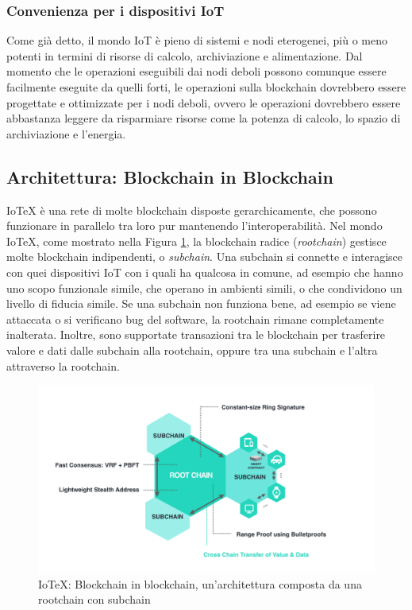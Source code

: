 \subsubsection{Convenienza per i dispositivi IoT}
Come già detto, il mondo IoT è pieno di sistemi e nodi eterogenei, più o meno potenti in termini di risorse di calcolo, archiviazione e alimentazione. Dal momento che le operazioni eseguibili dai nodi deboli possono comunque essere facilmente eseguite da quelli forti, le operazioni sulla blockchain dovrebbero essere progettate e ottimizzate per i nodi deboli, ovvero le operazioni dovrebbero essere abbastanza leggere da risparmiare risorse come la potenza di calcolo, lo spazio di archiviazione e l'energia.

\subsection{Architettura: Blockchain in Blockchain}
IoTeX è una rete di molte blockchain disposte gerarchicamente, che possono funzionare in parallelo tra loro pur mantenendo l'interoperabilità. Nel mondo IoTeX, come mostrato nella Figura \ref{fig:fig1}, la blockchain radice (\emph{rootchain}) gestisce molte blockchain indipendenti, o \emph{subchain}. Una subchain si connette e interagisce con quei dispositivi IoT con i quali ha qualcosa in comune, ad esempio che hanno uno scopo funzionale simile, che operano in ambienti simili, o che condividono un livello di fiducia simile. Se una subchain non funziona bene, ad esempio se viene attaccata o si verificano bug del software, la rootchain rimane completamente inalterata. Inoltre, sono supportate transazioni tra le blockchain per trasferire valore e dati dalle subchain alla rootchain, oppure tra una subchain e l'altra attraverso la rootchain.

\begin{figure}[ht]
	\includegraphics[width=\textwidth]{Figura1.png}
	\caption{IoTeX: Blockchain in blockchain, un'architettura composta da una rootchain con subchain}
	\label{fig:fig1}
\end{figure}

